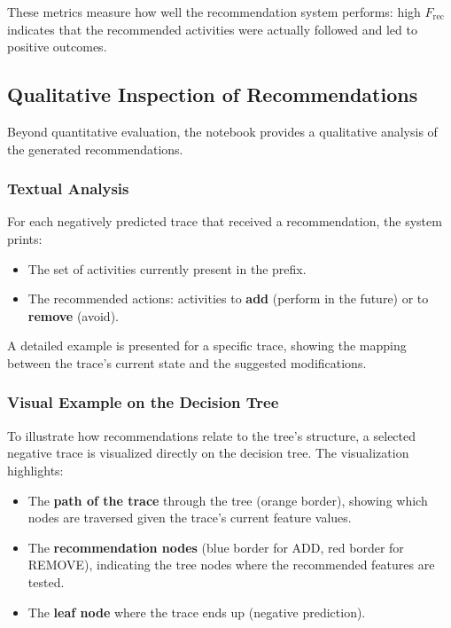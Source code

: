 \documentclass{article}
\begin{document}
\noindent
These metrics measure how well the recommendation system performs: high $F_{\text{rec}}$ indicates that the recommended activities were actually followed and led to positive outcomes.


\subsection{Qualitative Inspection of Recommendations}

Beyond quantitative evaluation, the notebook provides a qualitative analysis of the generated recommendations.

\subsubsection{Textual Analysis}

For each negatively predicted trace that received a recommendation, the system prints:
\begin{itemize}
    \item The set of activities currently present in the prefix.
    \item The recommended actions: activities to \textbf{add} (perform in the future) or to \textbf{remove} (avoid).
\end{itemize}

\noindent
A detailed example is presented for a specific trace, showing the mapping between the trace's current state and the suggested modifications.

\subsubsection{Visual Example on the Decision Tree}

To illustrate how recommendations relate to the tree's structure, a selected negative trace is visualized directly on the decision tree. The visualization highlights:
\begin{itemize}
    \item The \textbf{path of the trace} through the tree (orange border), showing which nodes are traversed given the trace's current feature values.
    \item The \textbf{recommendation nodes} (blue border for ADD, red border for REMOVE), indicating the tree nodes where the recommended features are tested.
    \item The \textbf{leaf node} where the trace ends up (negative prediction).
\end{itemize}
\end{document}
